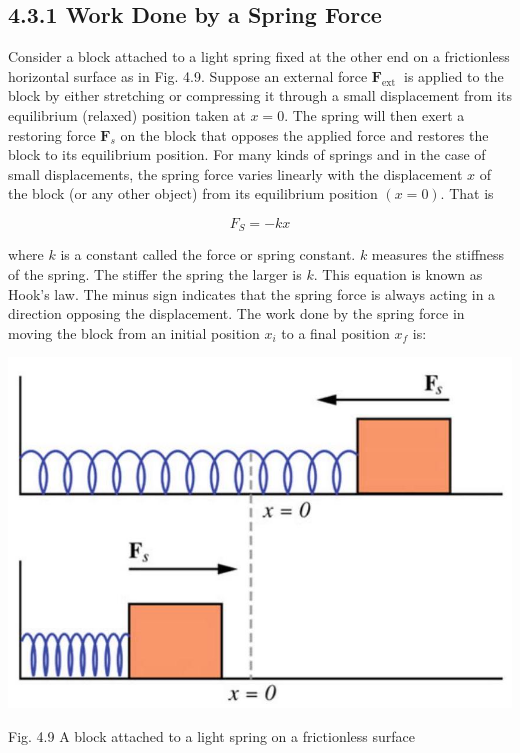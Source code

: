 \documentclass[10pt]{article}
\begin{document}
\subsection*{4.3.1 Work Done by a Spring Force}
Consider a block attached to a light spring fixed at the other end on a frictionless horizontal surface as in Fig. 4.9. Suppose an external force $\mathbf{F}_{\text {ext }}$ is applied to the block by either stretching or compressing it through a small displacement from its equilibrium (relaxed) position taken at $x=0$. The spring will then exert a restoring force $\mathbf{F}_{s}$ on the block that opposes the applied force and restores the block to its equilibrium position. For many kinds of springs and in the case of small displacements, the spring force varies linearly with the displacement $x$ of the block (or any other object) from its equilibrium position $(x=0)$. That is

$$
F_{S}=-k x
$$

where $k$ is a constant called the force or spring constant. $k$ measures the stiffness of the spring. The stiffer the spring the larger is $k$. This equation is known as Hook's law. The minus sign indicates that the spring force is always acting in a direction opposing the displacement. The work done by the spring force in moving the block from an initial position $x_{i}$ to a final position $x_{f}$ is:

\begin{center}
\includegraphics[max width=\textwidth]{2024_09_13_db1f357d2aad0a03eb2eg-066}
\end{center}

Fig. 4.9 A block attached to a light spring on a frictionless surface
\end{document}

